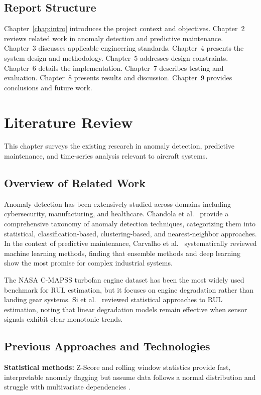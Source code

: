 \documentclass{CLS_zhou430}
\begin{document}
\section{Report Structure}
Chapter~\ref{chap:intro} introduces the project context and objectives. Chapter~2 reviews related work in anomaly detection and predictive maintenance. Chapter~3 discusses applicable engineering standards. Chapter~4 presents the system design and methodology. Chapter~5 addresses design constraints. Chapter~6 details the implementation. Chapter~7 describes testing and evaluation. Chapter~8 presents results and discussion. Chapter~9 provides conclusions and future work.


\chapter{Literature Review}

This chapter surveys the existing research in anomaly detection, predictive maintenance, and time-series analysis relevant to aircraft systems.

\section{Overview of Related Work}
Anomaly detection has been extensively studied across domains including cybersecurity, manufacturing, and healthcare. Chandola et al.\ \cite{chandola2009anomaly} provide a comprehensive taxonomy of anomaly detection techniques, categorizing them into statistical, classification-based, clustering-based, and nearest-neighbor approaches. In the context of predictive maintenance, Carvalho et al.\ \cite{carvalho2019systematic} systematically reviewed machine learning methods, finding that ensemble methods and deep learning show the most promise for complex industrial systems.

The NASA C-MAPSS turbofan engine dataset \cite{saxena2008damage} has been the most widely used benchmark for RUL estimation, but it focuses on engine degradation rather than landing gear systems. Si et al.\ \cite{si2011remaining} reviewed statistical approaches to RUL estimation, noting that linear degradation models remain effective when sensor signals exhibit clear monotonic trends.

\section{Previous Approaches and Technologies}
\textbf{Statistical methods:} Z-Score and rolling window statistics provide fast, interpretable anomaly flagging but assume data follows a normal distribution and struggle with multivariate dependencies \cite{chandola2009anomaly}.
\end{document}
